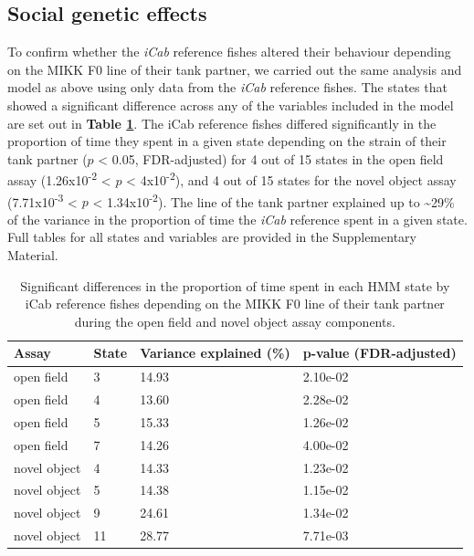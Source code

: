 \documentclass[
]{book}
\begin{document}
\hypertarget{social-genetic-effects-2}{%
\subsection{Social genetic effects}\label{social-genetic-effects-2}}

To confirm whether the \emph{\textcolor{iCab_424B4D}{iCab}} reference fishes altered their behaviour depending on the MIKK F0 line of their tank partner, we carried out the same analysis and model as above using only data from the \emph{\textcolor{iCab_424B4D}{iCab}} reference fishes. The states that showed a significant difference across any of the variables included in the model are set out in \textbf{Table \ref{tab:mikk-sge-F0}}. The iCab reference fishes differed significantly in the proportion of time they spent in a given state depending on the strain of their tank partner (\(p\) \textless{} 0.05, FDR-adjusted) for 4 out of 15 states in the open field assay (1.26x10\textsuperscript{-2} \textless{} \(p\) \textless{} 4x10\textsuperscript{-2}), and 4 out of 15 states for the novel object assay (7.71x10\textsuperscript{-3} \textless{} \(p\) \textless{} 1.34x10\textsuperscript{-2}). The line of the tank partner explained up to \textasciitilde29\% of the variance in the proportion of time the \emph{\textcolor{iCab_424B4D}{iCab}} reference spent in a given state. Full tables for all states and variables are provided in the Supplementary Material.

\begin{table}

\caption{\label{tab:mikk-sge-F0}Significant differences in the proportion of time spent in each HMM state by iCab reference fishes depending on the MIKK F0 line of their tank partner during the open field and novel object assay components.}
\centering
\begin{tabular}[t]{llll}
\toprule
Assay & State & Variance explained (\%) & p-value (FDR-adjusted)\\
\midrule
open field & 3 & 14.93 & 2.10e-02\\
open field & 4 & 13.60 & 2.28e-02\\
open field & 5 & 15.33 & 1.26e-02\\
open field & 7 & 14.26 & 4.00e-02\\
novel object & 4 & 14.33 & 1.23e-02\\
\addlinespace
novel object & 5 & 14.38 & 1.15e-02\\
novel object & 9 & 24.61 & 1.34e-02\\
novel object & 11 & 28.77 & 7.71e-03\\
\bottomrule
\end{tabular}
\end{table}
\end{document}
